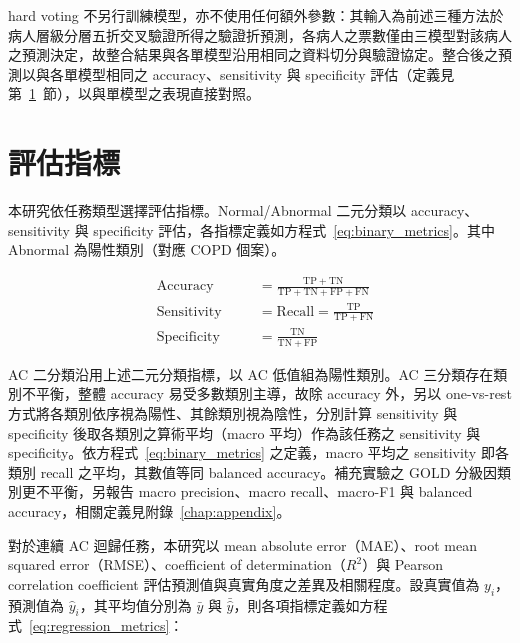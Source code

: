 \begin{ZhChapter}
hard voting 不另行訓練模型，亦不使用任何額外參數：其輸入為前述三種方法於病人層級分層五折交叉驗證所得之驗證折預測，各病人之票數僅由三模型對該病人之預測決定，故整合結果與各單模型沿用相同之資料切分與驗證協定。整合後之預測以與各單模型相同之 accuracy、sensitivity 與 specificity 評估（定義見第~\ref{sec:eval_metrics}~節），以與單模型之表現直接對照。

\section{評估指標}\label{sec:eval_metrics}

本研究依任務類型選擇評估指標。Normal/Abnormal 二元分類以 accuracy、sensitivity 與 specificity 評估，各指標定義如方程式~\eqref{eq:binary_metrics}\cite{he2009imbalanced}。其中 Abnormal 為陽性類別（對應 COPD 個案）。

\begin{equation}
\label{eq:binary_metrics}
\begin{alignedat}{2}
&\mathrm{Accuracy}\quad &&= \frac{\mathrm{TP} + \mathrm{TN}}{\mathrm{TP} + \mathrm{TN} + \mathrm{FP} + \mathrm{FN}} \\
&\mathrm{Sensitivity}\quad &&= \mathrm{Recall} = \frac{\mathrm{TP}}{\mathrm{TP} + \mathrm{FN}} \\
&\mathrm{Specificity}\quad &&= \frac{\mathrm{TN}}{\mathrm{TN} + \mathrm{FP}}
\end{alignedat}
\end{equation}

AC 二分類沿用上述二元分類指標，以 AC 低值組為陽性類別。AC 三分類存在類別不平衡，整體 accuracy 易受多數類別主導，故除 accuracy 外，另以 one-vs-rest 方式將各類別依序視為陽性、其餘類別視為陰性，分別計算 sensitivity 與 specificity 後取各類別之算術平均（macro 平均）作為該任務之 sensitivity 與 specificity。依方程式~\eqref{eq:binary_metrics} 之定義，macro 平均之 sensitivity 即各類別 recall 之平均，其數值等同 balanced accuracy。補充實驗之 GOLD 分級因類別更不平衡，另報告 macro precision、macro recall、macro-F1 與 balanced accuracy，相關定義見附錄~\ref{chap:appendix}。

對於連續 AC 迴歸任務，本研究以 mean absolute error（MAE）、root mean squared error（RMSE）、coefficient of determination（\(R^2\)）與 Pearson correlation coefficient 評估預測值與真實角度之差異及相關程度。設真實值為 \(y_i\)，預測值為 \(\hat{y}_i\)，其平均值分別為 \(\bar{y}\) 與 \(\bar{\hat{y}}\)，則各項指標定義如方程式~\eqref{eq:regression_metrics}：


\end{ZhChapter}
